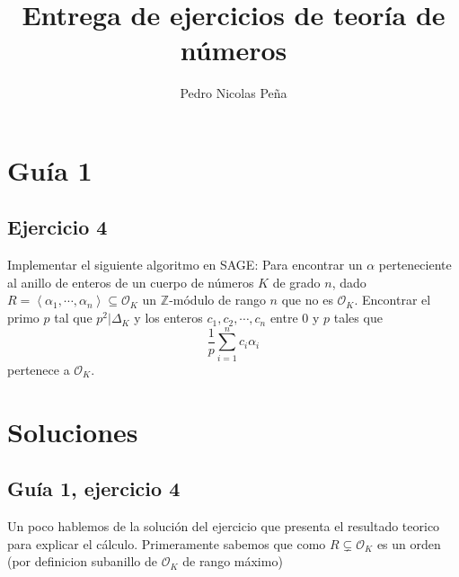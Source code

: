 \documentclass[12pt]{amsart}
\title{Entrega de ejercicios de teoría de números}
\author{Pedro Nicolas Peña}
\newcommand{\ZZ}{\mathbb{Z}}
\newcommand{\OO}{\mathcal{O}}
\newcommand{\lc}{\left<}
\newcommand{\rc}{\right>}
\theoremstyle{plain}
\begin{document}

\maketitle

\section*{Guía 1}

\subsection*{Ejercicio 4}
Implementar el siguiente algoritmo en SAGE: Para encontrar un $\alpha$
perteneciente al anillo de enteros de un cuerpo de números $K$ de 
grado $n$, dado $R=\lc \alpha_1,\cdots,\alpha_n\rc\subseteq\OO_K$ un 
$\ZZ$-módulo de rango $n$ que no es $\OO_K$. Encontrar el primo $p$ 
tal que $p^2|\Delta_K$ y los enteros $c_1,c_2,\cdots,c_n$ entre $0$ 
y $p$ tales que
$$\frac{1}{p}\sum_{i=1}^n c_i\alpha_i$$
pertenece a $\OO_K$.








\newpage

\section*{Soluciones}

\subsection*{Guía 1, ejercicio 4}
Un poco hablemos de la solución del ejercicio que presenta el resultado
teorico para explicar el cálculo. Primeramente sabemos que como 
$R \subsetneq \OO_K$ es un orden (por definicion subanillo de $\OO_K$
de rango máximo)
\end{document}
